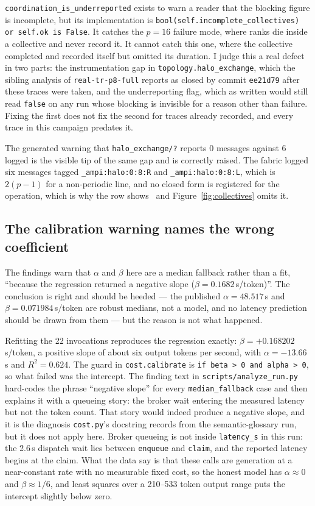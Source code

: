 \documentclass[11pt]{article}
\begin{document}
\texttt{coordination\_is\_underreported} exists to warn a reader that the blocking figure is
incomplete, but its implementation is \texttt{bool(self.incomplete\_collectives) or self.ok is
False}. It catches the $p=16$ failure mode, where ranks die inside a collective and never record
it. It cannot catch this one, where the collective completed and recorded itself but omitted its
duration. I judge this a real defect in two parts: the instrumentation gap in
\texttt{topology.halo\_exchange}, which the sibling analysis of \texttt{real-tr-p8-full} reports
as closed by commit \texttt{ee21d79} after these traces were taken, and the underreporting flag,
which as written would still read \texttt{false} on any run whose blocking is invisible for a
reason other than failure. Fixing the first does not fix the second for traces already recorded,
and every trace in this campaign predates it.

The generated warning that \texttt{halo\_exchange/?} reports 0 messages against 6 logged is the
visible tip of the same gap and is correctly raised. The fabric logged six messages tagged
\texttt{\_ampi:halo:0:8:R} and \texttt{\_ampi:halo:0:8:L}, which is $2(p-1)$ for a non-periodic
line, and no closed form is registered for the operation, which is why the row shows \modelna\
and Figure~\ref{fig:collectives} omits it.

\subsection*{The calibration warning names the wrong coefficient}

The findings warn that $\alpha$ and $\beta$ here are a median fallback rather than a fit,
``because the regression returned a negative slope ($\beta=0.1682$\,s/token)''. The conclusion is
right and should be heeded --- the published $\alpha=48.517$\,s and $\beta=0.071984$\,s/token are
robust medians, not a model, and no latency prediction should be drawn from them --- but the
reason is not what happened.

Refitting the 22 invocations reproduces the regression exactly: $\beta=+0.168202$\,s/token, a
positive slope of about six output tokens per second, with $\alpha=-13.66$\,s and $R^2=0.624$.
The guard in \texttt{cost.calibrate} is \texttt{if beta > 0 and alpha > 0}, so what failed was the
intercept. The finding text in \texttt{scripts/analyze\_run.py} hard-codes the phrase ``negative
slope'' for every \texttt{median\_fallback} case and then explains it with a queueing story: the
broker wait entering the measured latency but not the token count. That story would indeed
produce a negative slope, and it is the diagnosis \texttt{cost.py}'s docstring records from the
semantic-glossary run, but it does not apply here. Broker queueing is not inside
\texttt{latency\_s} in this run: the 2.6\,s dispatch wait lies between \texttt{enqueue} and
\texttt{claim}, and the reported latency begins at the claim. What the data say is that these
calls are generation at a near-constant rate with no measurable fixed cost, so the honest model
has $\alpha\approx0$ and $\beta\approx1/6$, and least squares over a 210--533 token output range
puts the intercept slightly below zero.
\end{document}
